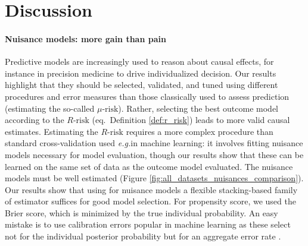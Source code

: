 \documentclass[11pt]{article}
\let\cite=\supercite
\newcommand{\eg}{\emph{e.g.}}
\begin{document}
\section{Discussion}\label{sec:discussion}


\paragraph{Nuisance models: more gain than pain}
%
Predictive models are increasingly used to reason about causal effects, for
instance in precision medicine to drive individualized decision. Our results
highlight that they should be selected, validated, and tuned using different
procedures and error measures than those classically used to assess prediction
(estimating the so-called $\mu\text{-risk}$). Rather, selecting the best outcome
model according to the $R\text{-risk}$ (eq.\, Definition \ref{def:r_risk}) leads
to more valid causal estimates. Estimating the $R\text{-risk}$ requires a more
complex procedure than standard cross-validation used \eg in machine
learning: it involves fitting nuisance models necessary for model evaluation,
though our results show that these can be learned on the same set of data as the
outcome model evaluated. The nuisance models must be well estimated (Figure
\ref{fig:all_datasets_nuisances_comparison}). Our results show that using for
nuisance models a flexible stacking-based family of estimator suffices for good
model selection. For propensity score, we used the Brier score,
which is minimized by the true individual probability. An easy mistake is to
use calibration errors popular in machine learning
\cite{platt_probabilistic_1999,zadrozny_obtaining_2001,niculescu-mizil_predicting_2005,minderer_revisiting_2021}
as these select not for the individual posterior probability but for an
aggregate error rate \cite{perez2022beyond}.


%
\end{document}
